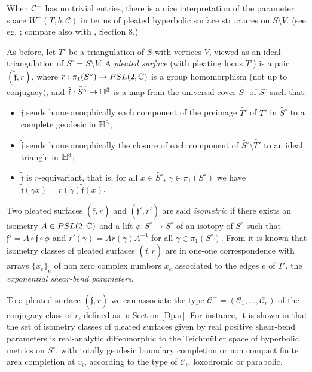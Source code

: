  When ${\mathcal C}^-$ has no trivial entries, there is a nice
interpretation of the parameter space $W^-(T,b,\mathcal{C})$ in
terms of pleated hyperbolic surface structures on $S\setminus V$.
(see eg. \cite{CEG}; compare also with \cite{BoL}, Section 8.)
\smallskip

As before, let $T'$ be a triangulation of $S$ with vertices $V$,
viewed as an ideal triangulation of $S^{\circ} = S \setminus V$. A
{\it pleated surface} (with pleating locus $T'$) is a pair
$(\tilde{\mathfrak{f}},r)$, where $r: \pi_1(S^{\circ}) \rightarrow
PSL(2,\mathbb{C})$ is a group homomorphism (not up to conjugacy), and
$\tilde{\mathfrak{f}} : \widetilde{S^{\circ}} \rightarrow \mathbb{H}^3$
is a map from the universal cover $\widetilde{S^{\circ}}$ of
$S^{\circ}$ such that:
\begin{itemize}
\item $\tilde{\mathfrak{f}}$ sends homeomorphically each component of
  the preimage $\tilde{T'}$ of $T'$ in $\widetilde{S^{\circ}}$ to a
  complete geodesic in $\mathbb{H}^3$;

\item $\tilde{\mathfrak{f}}$ sends homeomorphically the closure of
  each component of $\tilde{S^{\circ}} \setminus \tilde{T'}$ to an
  ideal triangle in $\mathbb{H}^3$;

\item $\tilde{\mathfrak{f}}$ is $r$-equivariant, that is, for all $x
  \in \tilde{S^{\circ}}$, $\gamma \in \pi_1(S^{\circ})$ we have
  $\tilde{\mathfrak{f}}(\gamma x) = r(\gamma)
  \tilde{\mathfrak{f}}(x)$.
\end{itemize}
Two pleated surfaces $(\tilde{\mathfrak{f}},r)$ and
$(\tilde{\mathfrak{f}}',r')$ are said {\it isometric} if there
exists an isometry $A \in PSL(2,\mathbb{C})$ and a lift $\tilde{\phi} :
\tilde{S^{\circ}} \rightarrow \tilde{S^{\circ}}$ of an isotopy of
$S^{\circ}$ such that $\tilde{\mathfrak{f}}' = A \circ
\tilde{\mathfrak{f}} \circ \tilde{\phi}$ and $r'(\gamma) = A
r(\gamma) A^{-1}$ for all $\gamma \in \pi_1(S^{\circ})$. From
\cite{Bo} it is known that isometry classes of pleated surfaces
$(\tilde{\mathfrak{f}},r)$ are in one-one correspondence with
arrays $\{x_e\}_e$ of non zero complex numbers $x_e$ associated to
the edges $e$ of $T'$, the {\it exponential shear-bend
parameters}.

To a pleated surface $(\tilde{\mathfrak{f}},r)$ we can associate
the type $\mathcal{C}^-=(\mathcal{C}_1,\ldots,\mathcal{C}_r)$ of
the conjugacy class of $r$, defined as in Section \ref{Dpar}. For
instance, it is shown in \cite{Th} that the set of isometry
classes of pleated surfaces given by real positive shear-bend
parameters is real-analytic diffeomorphic to the Teichm\"uller
space of hyperbolic metrics on $S^{\circ}$, with totally geodesic
boundary completion or non compact finite area completion at
$v_i$, according to the type of $\mathcal{C}_i$, loxodromic or
parabolic.

